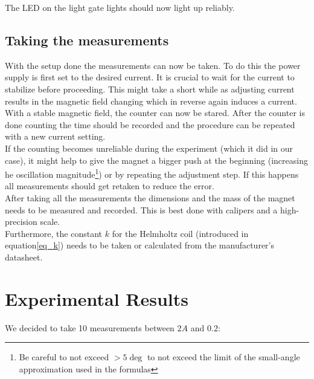 \documentclass[14pt]{article}
\begin{document}
The LED on the light gate lights should now light up reliably.

\subsection{Taking the measurements}

With the setup done the measurements can now be taken. To do this the power supply is first set to the desired current.
It is crucial to wait for the current to stabilize before proceeding. This might take a short while as adjusting current
results in the magnetic field changing which in reverse again induces a current.\\
With a stable magnetic field, the counter can now be stared. After the counter is done counting the time should be recorded
and the procedure can be repeated with a new current setting. \\
If the counting becomes unreliable during the experiment (which it did in our case), it might help to give the magnet a
bigger push at the beginning (increasing he oscillation magnitude\footnote{Be careful to not exceed $>5\deg$ to not exceed
the limit of the small-angle approximation used in the formulas}) or by repeating the adjustment step. If this happens
all measurements should get retaken to reduce the error.\\

After taking all the measurements the dimensions and the mass of the magnet needs to be measured and recorded.
This is best done with calipers and a high-precision scale.\\

Furthermore, the constant $k$ for the Helmholtz coil (introduced in equation\ref{eq_k}) needs to be taken or
calculated from the manufacturer's datasheet.

\section{Experimental Results}

We decided to take 10 measurements between $2A$ and $0.2$:\\



\begin{figure}[H]
  \begin{center}

  \end{center}
\end{figure}
\end{document}
